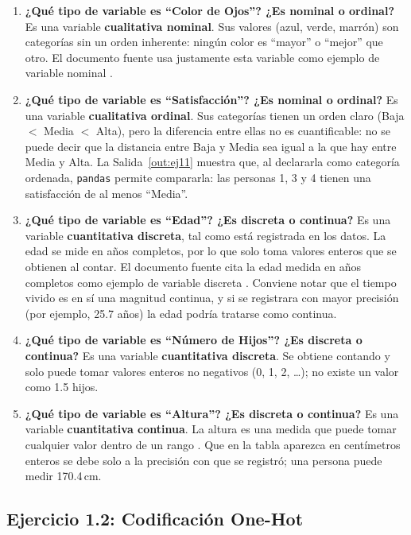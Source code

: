 \documentclass[11pt,letterpaper]{article}
\begin{document}
\begin{enumerate}
    \item \textbf{¿Qué tipo de variable es ``Color de Ojos''? ¿Es nominal o ordinal?} Es una variable \textbf{cualitativa nominal}. Sus valores (azul, verde, marrón) son categorías sin un orden inherente: ningún color es ``mayor'' o ``mejor'' que otro. El documento fuente usa justamente esta variable como ejemplo de variable nominal \parencite{tecnm2026_documento_fuente}.
    \item \textbf{¿Qué tipo de variable es ``Satisfacción''? ¿Es nominal o ordinal?} Es una variable \textbf{cualitativa ordinal}. Sus categorías tienen un orden claro (Baja $<$ Media $<$ Alta), pero la diferencia entre ellas no es cuantificable: no se puede decir que la distancia entre Baja y Media sea igual a la que hay entre Media y Alta. La Salida~\ref{out:ej11} muestra que, al declararla como categoría ordenada, \texttt{pandas} permite compararla: las personas 1, 3 y 4 tienen una satisfacción de al menos ``Media''.
    \item \textbf{¿Qué tipo de variable es ``Edad''? ¿Es discreta o continua?} Es una variable \textbf{cuantitativa discreta}, tal como está registrada en los datos. La edad se mide en años completos, por lo que solo toma valores enteros que se obtienen al contar. El documento fuente cita la edad medida en años completos como ejemplo de variable discreta \parencite{tecnm2026_documento_fuente}. Conviene notar que el tiempo vivido es en sí una magnitud continua, y si se registrara con mayor precisión (por ejemplo, 25.7 años) la edad podría tratarse como continua.
    \item \textbf{¿Qué tipo de variable es ``Número de Hijos''? ¿Es discreta o continua?} Es una variable \textbf{cuantitativa discreta}. Se obtiene contando y solo puede tomar valores enteros no negativos (0, 1, 2, \ldots); no existe un valor como 1.5 hijos.
    \item \textbf{¿Qué tipo de variable es ``Altura''? ¿Es discreta o continua?} Es una variable \textbf{cuantitativa continua}. La altura es una medida que puede tomar cualquier valor dentro de un rango \parencite{tecnm2026_documento_fuente}. Que en la tabla aparezca en centímetros enteros se debe solo a la precisión con que se registró; una persona puede medir 170.4\,cm.
\end{enumerate}

\subsection{Ejercicio 1.2: Codificación One-Hot}
\end{document}
